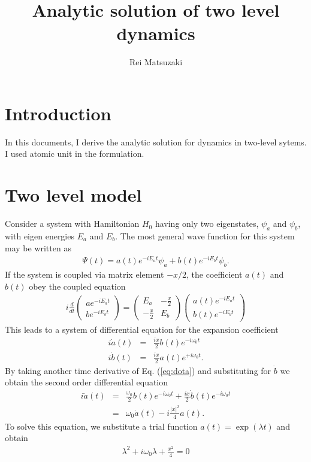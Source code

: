 \documentclass[a4paper]{article}
\begin{document}
\title{Analytic solution of two level dynamics}
\author{Rei Matsuzaki}
\maketitle

\section{Introduction}
In this documents, I derive the analytic solution for dynamics in two-level sytems.
I used atomic unit in the formulation.

\section{Two level model}
Consider a system with Hamiltonian $H_0$ having only two eigenstates, $\psi_a$ and $\psi_b$,
with eigen energies $E_a$ and $E_b$. The most general wave function for this system may be
written as
\begin{eqnarray}
  \Psi(t) = a(t)e^{-iE_at}\psi_a + b(t)e^{-iE_bt}\psi_b.
\end{eqnarray}
If the system is coupled via matrix element $-x/2$, the coefficient $a(t)$ and $b(t)$
obey the coupled equation
\begin{eqnarray}
  i \frac{d}{dt}
  \begin{pmatrix}
    a e^{-iE_at} \\
    b e^{-iE_bt}
  \end{pmatrix}
  =  
  \begin{pmatrix}
    E_a          & -\frac{x}{2} \\
    -\frac{x}{2} & E_b
  \end{pmatrix}
  \begin{pmatrix}
    a(t)e^{-iE_at} \\
    b(t)e^{-iE_bt}
  \end{pmatrix}
\end{eqnarray}
This leads to a system of differential equation for the expansion coefficient
\begin{eqnarray}
  i\dot{a}(t) &=& \frac{ix}{2}b(t)e^{-i\omega_0t}  \label{eq:dota} \\
  i\dot{b}(t) &=& \frac{ix}{2}a(t)e^{+i\omega_0t}. \label{eq:dotb}
\end{eqnarray}
By taking another time derivative of Eq. (\ref{eq:dota}) and substituting for $\dot{b}$
we obtain the second order differential equation
\begin{eqnarray}
  i\ddot{a}(t)
  &=& \frac{\omega_0}{2}b(t)e^{-i\omega_0t} + \frac{ix}{2}\dot{b}(t)e^{-i\omega_0t} \\
  &=& \omega_0\dot{a}(t) - i \frac{|x|^2}{4}a(t).
\end{eqnarray}
To solve this equation, we substitute a trial function $a(t)=\exp(\lambda t)$ and obtain
\begin{eqnarray}
  \lambda^2 + i \omega_0\lambda + \frac{x^2}{4} = 0
\end{eqnarray}
\end{document}
